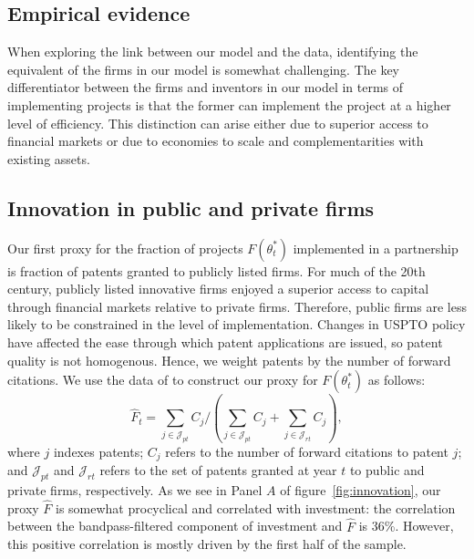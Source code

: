 \documentclass[12pt]{article}
\renewcommand{\cite}{\citet}
\begin{document}
\begin{ignore}

\section{Empirical evidence}

When exploring the link between our model and the data, identifying the equivalent of the firms in our model is somewhat challenging. The key differentiator between the firms and inventors in our model in terms of implementing projects is that the former can implement the project at a higher level of efficiency. This distinction can arise either due to superior access to financial markets or due to economies to scale and complementarities with existing assets.


\subsection{Innovation in public and private firms}


Our first proxy for the fraction of projects  $F(\theta^*_t)$ implemented in a partnership is fraction of patents granted to publicly listed firms. For much of the 20th century, publicly listed innovative firms enjoyed a superior access to capital through financial markets relative to private firms. Therefore, public firms  are less likely to be constrained in the level of implementation.  Changes in USPTO policy have affected the ease through which patent applications are issued, so patent quality is not homogenous. Hence, we weight patents by the number of forward citations.  We use  the data of \cite{KPSS2012} to construct our proxy for $F(\theta_t^*)$ as follows:
\begin{equation}
\hat F_t =  {\sum_{j\in \mathcal{J}_{pt}} C_{j} }\Bigg/ \left({ \sum_{j\in \mathcal{J}_{pt}} C_{j}} + \sum_{j\in \mathcal{J}_{rt}} C_{j}\right),
\end{equation}
where $j$ indexes patents; $C_j$ refers to the number of  forward citations to patent $j$; and $ \mathcal{J}_{pt}$ and  $\mathcal{J}_{rt}$ refers to the set of patents granted at year $t$ to public and private  firms, respectively. As we see in Panel $A$ of figure~\ref{fig:innovation}, our proxy $\hat F$ is somewhat procyclical and correlated with investment: the correlation between the bandpass-filtered component of investment and $\hat F$ is 36\%. However, this positive correlation is mostly driven by the first half of the sample.


\end{ignore}
\end{document}
